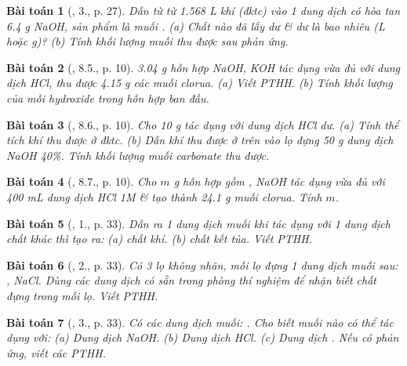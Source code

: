\documentclass{article}
\newtheorem{baitoan}{Bài toán}
\begin{document}
\begin{baitoan}[\cite{SGK_Hoa_Hoc_9}, 3., p. 27]
	Dẫn từ từ {\rm1.568 L} khí {\rm{}} (đktc) vào 1 dung dịch có hòa tan {\rm6.4 g NaOH}, sản phẩm là muối {\rm{}}. (a) Chất nào đã lấy dư \& dư là bao nhiêu ({\rm L} hoặc {\rm g})? (b) Tính khối lượng muối thu được sau phản ứng.
\end{baitoan}

\begin{baitoan}[\cite{SGK_Hoa_Hoc_9}, 8.5., p. 10]
	{\rm3.04 g} hỗn hợp {\rm NaOH, KOH} tác dụng vừa đủ với dung dịch {\rm HCl}, thu được {\rm4.15 g} các muối clorua. (a) Viết {\rm PTHH}. (b) Tính khối lượng của mỗi hydroxide trong hỗn hợp ban đầu.
\end{baitoan}

\begin{baitoan}[\cite{SGK_Hoa_Hoc_9}, 8.6., p. 10]
	Cho {\rm10 g } tác dụng với dung dịch {\rm HCl} dư. (a) Tính thể tích khí {\rm{}} thu được ở đktc. (b) Dẫn khí {\rm{}} thu được ở trên vào lọ đựng {\rm50 g} dung dịch {\rm NaOH 40\%}. Tính khối lượng muối carbonate thu được.
\end{baitoan}

\begin{baitoan}[\cite{SGK_Hoa_Hoc_9}, 8.7., p. 10]
	Cho $m$ {\rm g} hỗn hợp gồm {\rm{}, NaOH} tác dụng vừa đủ với {\rm400 mL} dung dịch {\rm HCl 1M} \& tạo thành {\rm24.1 g} muối clorua. Tính $m$.
\end{baitoan}

\begin{baitoan}[\cite{SGK_Hoa_Hoc_9}, 1., p. 33]
	Dẫn ra 1 dung dịch muối khi tác dụng với 1 dung dịch chất khác thì tạo ra: (a) chất khí. (b) chất kết tủa. Viết {\rm PTHH}.
\end{baitoan}

\begin{baitoan}[\cite{SGK_Hoa_Hoc_9}, 2., p. 33]
	Có 3 lọ không nhãn, mỗi lọ đựng 1 dung dịch muối sau: {\rm{}, NaCl}. Dùng các dung dịch có sẵn trong phòng thí nghiệm để nhận biết chất đựng trong mỗi lọ. Viết {\rm PTHH}.
\end{baitoan}

\begin{baitoan}[\cite{SGK_Hoa_Hoc_9}, 3., p. 33]
	Có các dung dịch muối: {\rm{}}. Cho biết muối nào có thể tác dụng với: (a) Dung dịch {\rm NaOH}. (b) Dung dịch {\rm HCl}. (c) Dung dịch {\rm{}}. Nếu có phản ứng, viết các PTHH.
\end{baitoan}
\end{document}
